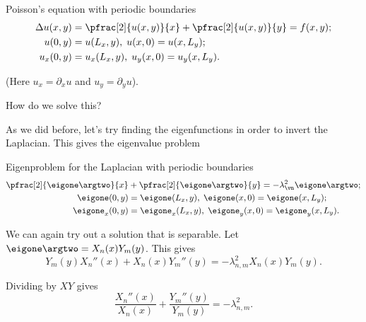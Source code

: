 \begin{frame}
	\begin{block}{\centering Poisson's equation with periodic boundaries}
		\begin{align*}
			\Delta u(x,y) &= \pfrac[2]{u(x,y)}{x} + \pfrac[2]{u(x,y)}{y} = f(x,y); \\
			u(0,y) &= u(L_x,y), \; u(x,0)=u(x,L_y); \\
			u_x(0,y) &= u_x(L_x,y), \; u_y(x,0)=u_y(x,L_y). 
		\end{align*}
	\end{block}
(Here $ u_x = \partial_x u$ and $ u_y = \partial_y u$).

\pause
How do we solve this?
\end{frame}

\begin{frame}
	As we did before, let's try finding the eigenfunctions in order to invert the Laplacian. This gives
	the eigenvalue problem
	
	\pause
	\begin{block}{\centering Eigenproblem for the Laplacian with periodic boundaries}
		\begin{align*}
			 \pfrac[2]{\eigone\argtwo}{x} &+ \pfrac[2]{\eigone\argtwo}{y} = -\lambda_\vn^2 \eigone\argtwo; \\
			\eigone(0,y) &= \eigone(L_x,y), \; \eigone(x,0)=\eigone(x,L_y); \\
			\eigone_x(0,y) &= \eigone_x(L_x,y), \; \eigone_y(x,0)=\eigone_y(x,L_y). 
		\end{align*}
	\end{block}
	
	\pause
	We can again try out a solution that is separable. Let $ \eigone\argtwo = X_n(x)Y_m(y) $. This gives
	\[  
	Y_m(y) X_n''(x) + X_n(x) Y_m''(y) = -\lambda_{n,m}^2 X_n(x) Y_m(y).
	\]
	
	\pause
	Dividing by $XY$ gives
	\[  
	\frac{X_n''(x)}{X_n(x)} + \frac{Y_m''(y)}{Y_m(y)} = -\lambda_{n,m}^2.
	\]
\end{frame}

